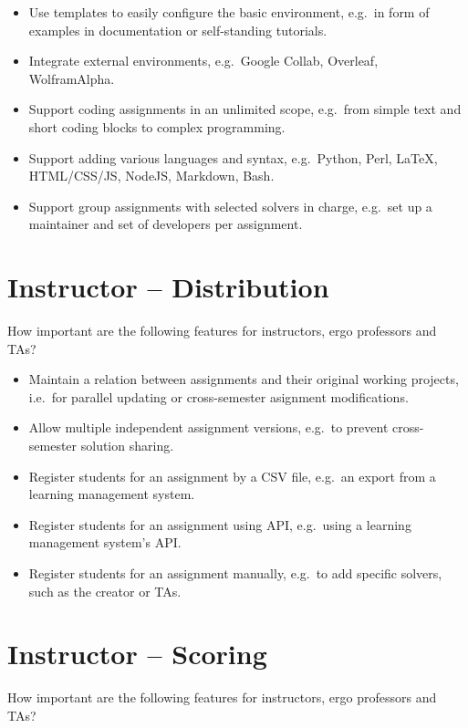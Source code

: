 \begin{itemize}
\item
  Use templates to easily configure the basic environment, e.g.~in form of examples in documentation or self-standing tutorials.
\item
  Integrate external environments, e.g.~Google Collab, Overleaf, WolframAlpha.
\item
  Support coding assignments in an unlimited scope, e.g.~from simple text and short coding blocks to complex programming.
\item
  Support adding various languages and syntax, e.g.~Python, Perl, LaTeX, HTML/CSS/JS, NodeJS, Markdown, Bash.
\item
  Support group assignments with selected solvers in charge, e.g.~set up a maintainer and set of developers per assignment.
\end{itemize}

\section{Instructor -- Distribution}\label{sec:instructor-distribution}

How important are the following features for instructors, ergo professors and TAs?

\begin{itemize}
\item
  Maintain a relation between assignments and their original working projects, i.e.~for parallel updating or cross-semester asignment modifications.
\item
  Allow multiple independent assignment versions, e.g.~to prevent cross-semester solution sharing.
\item
  Register students for an assignment by a CSV file, e.g.~an export from a learning management system.
\item
  Register students for an assignment using API, e.g.~using a learning management system's API.
\item
  Register students for an assignment manually, e.g.~to add specific solvers, such as the creator or TAs.
\end{itemize}

\section{Instructor -- Scoring}\label{sec:instructor-scoring}

How important are the following features for instructors, ergo professors and TAs?


